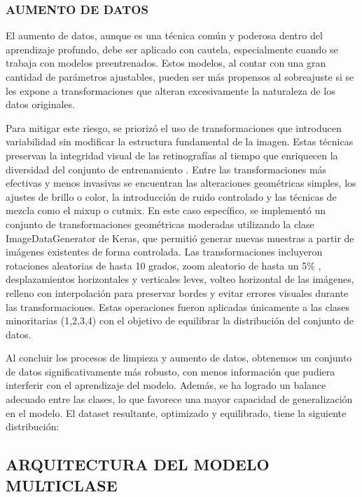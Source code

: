 \subsubsection{AUMENTO DE DATOS}

El aumento de datos, aunque es una técnica común y poderosa dentro del aprendizaje
profundo, debe ser aplicado con cautela, especialmente cuando se trabaja con modelos
preentrenados. Estos modelos, al contar con una gran cantidad de parámetros ajustables,
pueden ser más propensos al sobreajuste si se les expone a transformaciones que alteran
excesivamente la naturaleza de los datos originales.

Para mitigar este riesgo, se priorizó el uso de transformaciones que introducen
variabilidad sin modificar la estructura fundamental de la imagen. Estas técnicas
preservan la integridad visual de las retinografías al tiempo que enriquecen la diversidad
del conjunto de entrenamiento . Entre las transformaciones
más efectivas y menos invasivas se encuentran las alteraciones geométricas simples, los
ajustes de brillo o color, la introducción de ruido controlado y las técnicas de mezcla
como el mixup o cutmix. En este caso específico, se implementó un conjunto de
transformaciones geométricas moderadas utilizando la clase ImageDataGenerator de Keras,
que permitió generar nuevas muestras a partir de imágenes existentes de forma controlada.
Las transformaciones incluyeron rotaciones aleatorias de hasta 10 grados, zoom aleatorio
de hasta un 5\% , desplazamientos horizontales y verticales leves, volteo horizontal de
las imágenes, relleno con interpolación para preservar bordes y evitar errores visuales
durante las transformaciones. Estas operaciones fueron aplicadas únicamente a las clases
minoritarias (1,2,3,4) con el objetivo de equilibrar la distribución del conjunto de
datos.


Al concluir los procesos de limpieza y aumento de datos, obtenemos un conjunto de datos
significativamente más robusto, con menos información que pudiera interferir con el
aprendizaje del modelo. Además, se ha logrado un balance adecuado entre las clases, lo que
favorece una mayor capacidad de generalización en el modelo. El dataset resultante,
optimizado y equilibrado, tiene la siguiente distribución:



\subsection{ARQUITECTURA DEL MODELO MULTICLASE}

